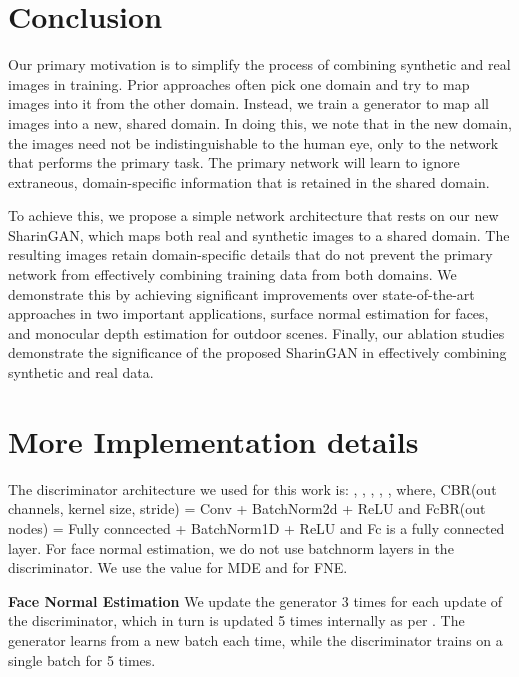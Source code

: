 \documentclass[10pt,twocolumn,letterpaper]{article}
\begin{document}
\section{Conclusion}
Our primary motivation is to simplify the process of combining synthetic and real images in training.  Prior approaches often pick one domain and try to map images into it from the other domain.  Instead, we train a generator to map all images into a new, shared domain.  In doing this, we note that in the new domain, the images need not be indistinguishable to the human eye, only to the network that performs the primary task.  The primary network will learn to ignore extraneous, domain-specific information that is retained in the shared domain.

To achieve this, we propose a simple network architecture that rests on our new SharinGAN, which maps both real and synthetic images to a shared domain.  The resulting images retain domain-specific details that do not prevent the primary network from effectively combining training data from both domains.  We demonstrate this by achieving significant improvements over state-of-the-art approaches in two important applications, surface normal estimation for faces, and monocular depth estimation for outdoor scenes.  Finally, our ablation studies demonstrate the significance of the proposed SharinGAN in effectively combining synthetic and real data.








{\small


}

\cleardoublepage

\section{More Implementation details}
The discriminator architecture we used for this work is:  , , , , , where, CBR(out channels, kernel size, stride) = Conv + BatchNorm2d + ReLU and FcBR(out nodes) = Fully conncected + BatchNorm1D + ReLU and Fc is a fully connected layer. For face normal estimation, we do not use batchnorm layers in the discriminator. We use the value  for MDE and  for FNE. 



\textbf{Face Normal Estimation} We update the generator 3 times for each update of the discriminator, which in turn is  updated 5 times internally as per \cite{WGAN,WGANGP}. The generator learns from a new batch each time, while the discriminator trains on a single batch for 5 times.
\end{document}
